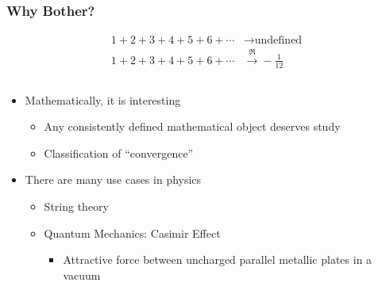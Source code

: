 \documentclass{beamer}
\begin{document}
\begin{frame}
\frametitle{Why Bother?}

\begin{align*}
    1 + 2 + 3 + 4 + 5 + 6 + \cdots &\stackrel{}{\longrightarrow} \text{undefined} \\
    1 + 2 + 3 + 4 + 5 + 6 + \cdots &\stackrel{\mathfrak{R}}{\longrightarrow} -\frac{1}{12}
\end{align*}

\begin{columns}[c] %

\begin{column}{0.7\textwidth} %

\begin{itemize}
    \item Mathematically, it is interesting 
    \begin{itemize}
        \item Any consistently defined mathematical object deserves study 
        \item Classification of ``convergence'' 
    \end{itemize}
    \item There are many use cases in physics 
    \begin{itemize}
        \item String theory 
        \item Quantum Mechanics: Casimir Effect
        \begin{itemize}
            \item Attractive force between uncharged parallel metallic plates in a vacuum 
        \end{itemize}
    \end{itemize}
\end{itemize}

\end{column}
\begin{column}{0.3\textwidth} %


\end{column}
\end{columns}
\end{frame}
\end{document}

